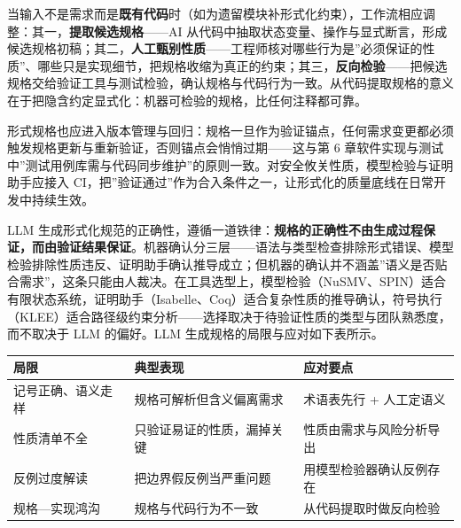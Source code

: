 \documentclass[12pt,a4paper,twoside,openany]{ctexbook}
\numberwithin{figure}{chapter}
\numberwithin{table}{chapter}
\newcounter{none}
\begin{document}
当输入不是需求而是\textbf{既有代码}时（如为遗留模块补形式化约束），工作流相应调整：其一，\textbf{提取候选规格}------AI
从代码中抽取状态变量、操作与显式断言，形成候选规格初稿；其二，\textbf{人工甄别性质}------工程师核对哪些行为是''必须保证的性质''、哪些只是实现细节，把规格收缩为真正的约束；其三，\textbf{反向检验}------把候选规格交给验证工具与测试检验，确认规格与代码行为一致。从代码提取规格的意义在于把隐含约定显式化：机器可检验的规格，比任何注释都可靠。

形式规格也应进入版本管理与回归：规格一旦作为验证锚点，任何需求变更都必须触发规格更新与重新验证，否则锚点会悄悄过期------这与第
6
章软件实现与测试中''测试用例库需与代码同步维护''的原则一致。对安全攸关性质，模型检验与证明助手应接入
CI，把''验证通过''作为合入条件之一，让形式化的质量底线在日常开发中持续生效。

LLM
生成形式化规范的正确性，遵循一道铁律：\textbf{规格的正确性不由生成过程保证，而由验证结果保证}。机器确认分三层------语法与类型检查排除形式错误、模型检验排除性质违反、证明助手确认推导成立；但机器的确认并不涵盖''语义是否贴合需求''，这条只能由人裁决。在工具选型上，模型检验（NuSMV、SPIN）适合有限状态系统，证明助手（Isabelle、Coq）适合复杂性质的推导确认，符号执行（KLEE）适合路径级约束分析------选择取决于待验证性质的类型与团队熟悉度，而不取决于
LLM 的偏好。LLM 生成规格的局限与应对如下表所示。

{\def\LTcaptype{none} %
\begin{longtable}[]{@{}
  >{\raggedright\arraybackslash}p{}
  >{\raggedright\arraybackslash}p{}
  >{\raggedright\arraybackslash}p{}@{}}
\toprule\noalign{}
\begin{minipage}[b]{\linewidth}\raggedright
局限
\end{minipage} & \begin{minipage}[b]{\linewidth}\raggedright
典型表现
\end{minipage} & \begin{minipage}[b]{\linewidth}\raggedright
应对要点
\end{minipage} \\
\midrule\noalign{}
\endhead
\bottomrule\noalign{}
\endlastfoot
记号正确、语义走样 & 规格可解析但含义偏离需求 & 术语表先行 +
人工定语义 \\
性质清单不全 & 只验证易证的性质，漏掉关键 & 性质由需求与风险分析导出 \\
反例过度解读 & 把边界假反例当严重问题 & 用模型检验器确认反例存在 \\
规格---实现鸿沟 & 规格与代码行为不一致 & 从代码提取时做反向检验 \\
\end{longtable}
}
\end{document}
